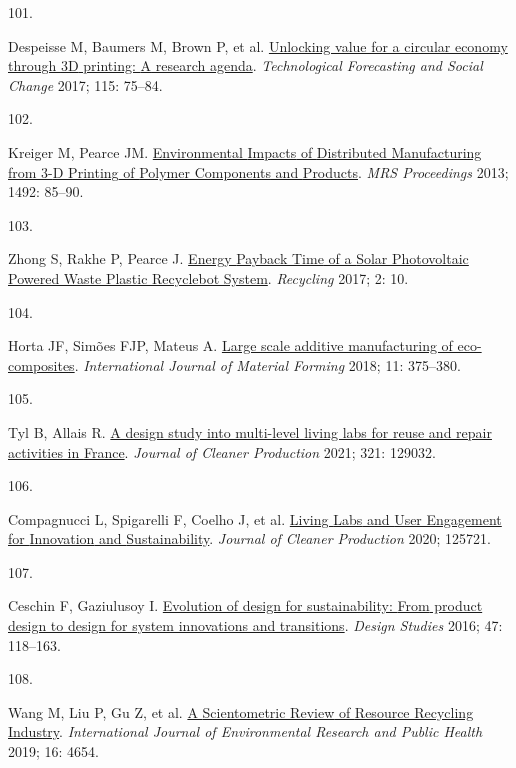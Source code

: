 \documentclass[
  12pt,
  a4paperpaper,
  onecolumn]{article}
\newlength{\cslhangindent}
\newlength{\csllabelwidth}
\newlength{\cslentryspacingunit} %
\newenvironment{CSLReferences}[2] %
 {%
  \setlength{\parindent}{0pt}
  \ifodd #1
  \let\oldpar\par
  \def\par{\hangindent=\cslhangindent\oldpar}
  \fi
  \setlength{\parskip}{#2\cslentryspacingunit}
 }%
 {}
\newcommand{\CSLLeftMargin}[1]{\parbox[t]{\csllabelwidth}{#1}}
\newcommand{\CSLRightInline}[1]{\parbox[t]{\linewidth - \csllabelwidth}{#1}\break}
\begin{document}
\begin{CSLReferences}{0}{0}
\leavevmode{}%
\CSLLeftMargin{101. }%
\CSLRightInline{Despeisse M, Baumers M, Brown P, et al.
\href{https://doi.org/10.1016/j.techfore.2016.09.021}{Unlocking value
for a circular economy through {3D} printing: {A} research agenda}.
\emph{Technological Forecasting and Social Change} 2017; 115: 75--84.}

\leavevmode{}%
\CSLLeftMargin{102. }%
\CSLRightInline{Kreiger M, Pearce JM.
\href{https://doi.org/10.1557/opl.2013.319}{Environmental {Impacts} of
{Distributed Manufacturing} from 3-{D Printing} of {Polymer Components}
and {Products}}. \emph{MRS Proceedings} 2013; 1492: 85--90.}

\leavevmode{}%
\CSLLeftMargin{103. }%
\CSLRightInline{Zhong S, Rakhe P, Pearce J.
\href{https://doi.org/10.3390/recycling2020010}{Energy {Payback Time} of
a {Solar Photovoltaic Powered Waste Plastic Recyclebot System}}.
\emph{Recycling} 2017; 2: 10.}

\leavevmode{}%
\CSLLeftMargin{104. }%
\CSLRightInline{Horta JF, Simões FJP, Mateus A.
\href{https://doi.org/10.1007/s12289-017-1364-5}{Large scale additive
manufacturing of eco-composites}. \emph{International Journal of
Material Forming} 2018; 11: 375--380.}

\leavevmode{}%
\CSLLeftMargin{105. }%
\CSLRightInline{Tyl B, Allais R.
\href{https://doi.org/10.1016/J.JCLEPRO.2021.129032}{A design study into
multi-level living labs for reuse and repair activities in {France}}.
\emph{Journal of Cleaner Production} 2021; 321: 129032.}

\leavevmode{}%
\CSLLeftMargin{106. }%
\CSLRightInline{Compagnucci L, Spigarelli F, Coelho J, et al.
\href{https://doi.org/10.1016/j.jclepro.2020.125721}{Living {Labs} and
{User Engagement} for {Innovation} and {Sustainability}}. \emph{Journal
of Cleaner Production} 2020; 125721.}

\leavevmode{}%
\CSLLeftMargin{107. }%
\CSLRightInline{Ceschin F, Gaziulusoy I.
\href{https://doi.org/10.1016/j.destud.2016.09.002}{Evolution of design
for sustainability: {From} product design to design for system
innovations and transitions}. \emph{Design Studies} 2016; 47: 118--163.}

\leavevmode{}%
\CSLLeftMargin{108. }%
\CSLRightInline{Wang M, Liu P, Gu Z, et al.
\href{https://doi.org/10.3390/ijerph16234654}{A {Scientometric Review}
of {Resource Recycling Industry}}. \emph{International Journal of
Environmental Research and Public Health} 2019; 16: 4654.}


\end{CSLReferences}
\end{document}
